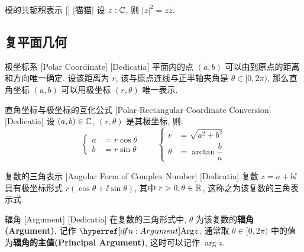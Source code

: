         \begin{ppt}
            {模的共轭积表示}
            []
            [猫猫]
            设 \(z:\operatorname{\mathbb{C}}\), 则 \(|z|^2=z\bar{z}\). 
        \end{ppt}
    
    \subsection{复平面几何}
    
        \begin{dfn}
            [Polar]
            {极坐标系}
            [Polar Coordinate]
            [Dedicatia]
            平面内的点 \((a,b)\) 可以由到原点的距离和方向唯一确定. 设该距离为 \(r\), 该与原点连线与正半轴夹角是 \(\theta\in[0,2\pi)\), 那么直角坐标 \((a,b)\) 可以用极坐标 \((r,\theta)\) 唯一表示. 
        \end{dfn}

        \begin{ppt}
            {直角坐标与极坐标的互化公式}
            [Polar-Rectangular Coordinate Conversion]
            [Dedicatia]
            设 \((a,b)\in\operatorname{\mathbb{C}}\), \((r,\theta)\) 是其极坐标, 则:
            \[\begin{cases}
                a&=r\cos\theta\\
                b&=r\sin\theta
            \end{cases}\qquad\begin{cases}
                r&=\sqrt{a^2+b^2}\\
                \theta&=\arctan\dfrac{b}{a}
            \end{cases}\]
        \end{ppt}

        \begin{dfn}
            {复数的三角表示}
            [Angular Form of Complex Number]
            [Dedicatia]
            复数 \(z=a+b\ii\) 具有极坐标形式 \(r(\cos\theta+\ii\sin\theta)\), 其中 \(r>0, \theta\in\operatorname{\mathbb{R}}\), 这称之为该复数的三角表示式. 
        \end{dfn}

        \begin{dfn}
            [Argument]
            {辐角}
            [Argument]
            [Dedicatia]
            在复数的三角形式中, \(\theta\) 为该复数的\textbf{辐角(Argument)}, 记作 \(\Arg z\). 通常取 \(\theta\in[0,2\pi)\) 中的值为\textbf{辐角的主值(Principal Argument)}, 这时可以记作 \(\arg{z}\).
        \end{dfn}

